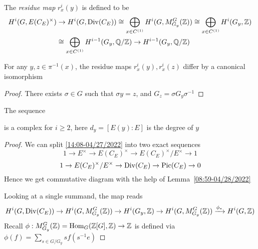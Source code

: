 \documentclass[a4paper,10pt]{article}
\begin{document}
\begin{definition}
The \textit{residue map} $r^i_x(y)$ is defined to be
\begin{align*}
H^i(G,E(C_E)^\times)&\to H^i(G,\operatorname{Div}(C_E))\cong\bigoplus_{x\in C^{(1)}}H^i(G,M^G_{G_y}(\mathbb Z))\cong\bigoplus_{x\in C^{(1)}}H^i(G_y,\mathbb Z)\\
&\cong\bigoplus_{x\in C^{(1)}}H^{i-1}(G_y,\mathbb Q/\mathbb Z)\to H^{i-1}(G_y,\mathbb Q/\mathbb Z)
\end{align*}
\end{definition}

\begin{lemma}
For any $y,z\in\pi^{-1}(x)$, the residue maps $r_x^i(y),r_x^i(z)$ differ by a canonical isomorphism
\end{lemma}

\begin{proof}
There exists $\sigma\in G$ such that $\sigma y=z$, and $G_z=\sigma G_y\sigma^{-1}$
\end{proof}

\begin{lemma}
The sequence
\begin{center}\label{13:06-04/29/2022}
\end{center}
is a complex for $i\geq2$, here $d_y=[E(y):E]$ is the degree of $y$
\end{lemma}

\begin{proof}
We can split \eqref{14:08-04/27/2022} into two exact sequences
\begin{equation}\label{00:30-04/48/2022}
1\to E^\times\to E(C_E)^\times\to E(C_E)^\times/E^\times\to1
\end{equation}
\begin{equation}\label{00:31-04/48/2022}
1\to E(C_E)^\times/E^\times\to\operatorname{Div}(C_E)\to\operatorname{Pic}(C_E)\to0
\end{equation}
Hence we get commutative diagram with the help of Lemma~\ref{08:59-04/28/2022}
\begin{center}
\end{center}
Looking at a single summand, the map reads
\[
H^i(G,\operatorname{Div}(C_E))\to H^i(G,M^G_{G_y}(\mathbb Z))\to H^{i}(G_y,\mathbb Z)\to H^i(G,M^G_{G_y}(\mathbb Z))\xrightarrow{\phi_*}H^i(G,\mathbb Z)
\]
Recall $\phi:M^G_{G_y}(\mathbb Z)=\operatorname{Hom}_G(\mathbb Z[G],\mathbb Z)\to \mathbb Z$ is defined via $\phi(f)=\sum_{s\in G/G_y}sf(s^{-1}e)$
\end{proof}
\end{document}
